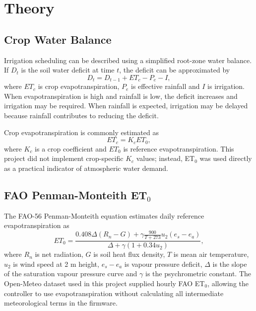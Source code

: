 \documentclass[12pt,a4paper]{report}
\begin{document}
\chapter{Theory}

\section{Crop Water Balance}
Irrigation scheduling can be described using a simplified root-zone water balance. If $D_t$ is the soil water deficit at time $t$, the deficit can be approximated by
\begin{equation}
	D_t = D_{t-1} + ET_c - P_e - I,
	\label{eq:water_balance}
\end{equation}
where $ET_c$ is crop evapotranspiration, $P_e$ is effective rainfall and $I$ is irrigation. When evapotranspiration is high and rainfall is low, the deficit increases and irrigation may be required. When rainfall is expected, irrigation may be delayed because rainfall contributes to reducing the deficit.

Crop evapotranspiration is commonly estimated as
\begin{equation}
	ET_c = K_c ET_0,
	\label{eq:etc}
\end{equation}
where $K_c$ is a crop coefficient and $ET_0$ is reference evapotranspiration. This project did not implement crop-specific $K_c$ values; instead, ET$_0$ was used directly as a practical indicator of atmospheric water demand.

\section{\texorpdfstring{FAO Penman-Monteith ET$_0$}{FAO Penman-Monteith ET0}}
The FAO-56 Penman-Monteith equation estimates daily reference evapotranspiration as \citep{allen1998crop}
\begin{equation}
	ET_0 =
	\frac{0.408\Delta(R_n-G)+\gamma\frac{900}{T+273}u_2(e_s-e_a)}
	{\Delta+\gamma(1+0.34u_2)},
	\label{eq:penman}
\end{equation}
where $R_n$ is net radiation, $G$ is soil heat flux density, $T$ is mean air temperature, $u_2$ is wind speed at 2 m height, $e_s-e_a$ is vapour pressure deficit, $\Delta$ is the slope of the saturation vapour pressure curve and $\gamma$ is the psychrometric constant. The Open-Meteo dataset used in this project supplied hourly FAO ET$_0$, allowing the controller to use evapotranspiration without calculating all intermediate meteorological terms in the firmware.
\end{document}
